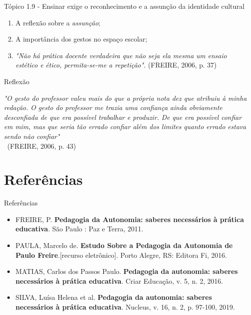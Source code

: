 \documentclass[12pt]{beamer}
\begin{document}
	\begin{frame}{Tópico 1.9 - Ensinar exige o reconhecimento e a assunção da identidade cultural}
		\begin{enumerate}
			\justifying
			\item A reflexão sobre a \textit{assunção}; \\
			\item A importância dos gestos no espaço escolar; \\
			\item \textit{"Não há prática docente verdadeira que não seja ela mesma um ensaio estético e ético, permita-se-me a repetição".}  (FREIRE, 2006, p. 37)
			
		\end{enumerate}
	\end{frame}
	
	\begin{frame}{Reflexão}
		\justifying
		
		\textit{"O gesto do professor valeu mais do que a própria
			nota dez que atribuiu à minha redação. O gesto do
			professor me trazia uma confiança ainda obviamente desconfiada de que era possível trabalhar e produzir. De que era possível confiar em mim, mas que seria tão errado confiar além dos
			limites quanto errado estava sendo não confiar"} \\ \ (FREIRE, 2006, p. 43)
	\end{frame}

\section{Referências}

\begin{frame}{Referências}
	
	\begin{itemize}
		\justifying
		\item FREIRE, P. \textbf{Pedagogia da Autonomia: saberes necessários à prática educativa}. São Paulo : Paz e Terra, 2011.
		
		\item PAULA, Marcelo de. \textbf{Estudo Sobre a Pedagogia da Autonomia de Paulo Freire}.[recurso eletrônico]. Porto Alegre, RS: Editora Fi, 2016. 
		
		\item MATIAS, Carlos dos Passos Paulo. \textbf{Pedagogia da autonomia: saberes necessários à prática educativa}. Criar Educação, v. 5, n. 2, 2016.
		
		\item SILVA, Luísa Helena et al. \textbf{Pedagogia da autonomia: saberes necessários à prática educativa}. Nucleus, v. 16, n. 2, p. 97-100, 2019.
		
	\end{itemize}
\end{frame}
\end{document}
